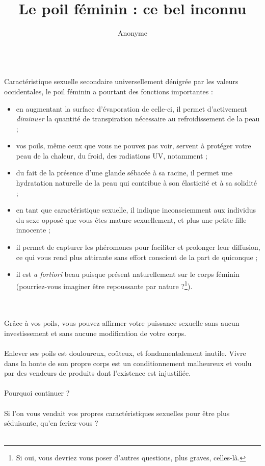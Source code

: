 \documentclass[a4paper]{article}
\title{Le poil féminin : ce bel inconnu}
\author{Anonyme}
\begin{document}
\maketitle

\\
Caractéristique sexuelle secondaire universellement dénigrée par les valeurs
occidentales, le poil féminin a pourtant des fonctions importantes : \\

\begin{itemize}
\item en augmentant la surface d’évaporation de celle-ci, il permet
d’activement \emph{diminuer} la quantité de transpiration nécessaire au
refroidissement de la peau ;
\item vos poils, même ceux que vous ne pouvez pas voir, servent à protéger
	votre peau de la chaleur, du froid, des radiations UV, notamment ;
\item du fait de la présence d’une glande sébacée à sa racine, il permet une
	hydratation naturelle de la peau qui contribue à son élasticité et à sa
	solidité ;
\item en tant que caractéristique sexuelle, il indique inconsciemment aux
	individus du sexe opposé que vous êtes mature sexuellement, et plus une
	petite fille innocente ;
\item il permet de capturer les phéromones pour faciliter et prolonger leur
	diffusion, ce qui vous rend plus attirante sans effort conscient de la
	part de quiconque ;
\item il est \emph{a fortiori} beau puisque présent naturellement sur le corps
	féminin (pourriez-vous imaginer être repoussante par nature
	?\footnote{Si oui, vous devriez vous poser d’autres questions, plus
	graves, celles-là.}).\\
\end{itemize}
\\
\\
Grâce à vos poils, vous pouvez affirmer votre puissance sexuelle sans aucun
investissement et sans aucune modification de votre corps. \\
\\
Enlever ses poils est douloureux, coûteux, et fondamentalement inutile. Vivre
dans la honte de son propre corps est un conditionnement malheureux et voulu
par des vendeurs de produits dont l'existence est injustifiée. \\
\\
Pourquoi continuer ? \\
\\
Si l’on vous vendait vos propres caractéristiques sexuelles pour être plus
séduisante, qu’en feriez-vous ? \\
\\
\pagestyle {empty} %
\end{document}
